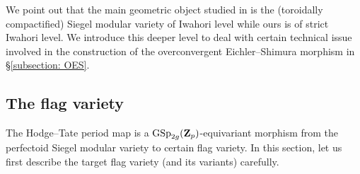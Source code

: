 \begin{Remark}\label{Remark: why strict Iwahori level}
\normalfont We point out that the main geometric object studied in \cite{AIP-2015} is the (toroidally compactified) Siegel modular variety of Iwahori level while ours is of strict Iwahori level. We introduce this deeper level to deal with certain technical issue involved in the construction of the overconvergent Eichler--Shimura morphism in \S \ref{subsection: OES}. 
\end{Remark}


\subsection{The flag variety}\label{subsection: flag varieties}
The Hodge--Tate period map is a $\operatorname{GSp}_{2g}(\operatorname{\mathbf{Z}}_p)$-equivariant morphism from the perfectoid Siegel modular variety to certain flag variety. In this section, let us first describe the target flag variety (and its variants) carefully. 


